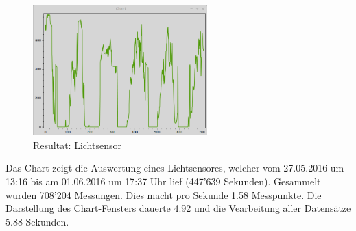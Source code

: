 \begin{figure}[H]
  \centering
  \includegraphics[width=0.6\textwidth]{./images/resultat.png}
  \caption{Resultat: Lichtsensor}
\end{figure}

Das Chart zeigt die Auswertung eines Lichtsensores, welcher vom 27.05.2016 um 13:16 bis am 01.06.2016 um 17:37 Uhr lief (447'639 Sekunden). Gesammelt wurden 708'204 Messungen. Dies macht pro Sekunde 1.58 Messpunkte. Die Darstellung des Chart-Fensters dauerte 4.92 und die Vearbeitung aller Datensätze 5.88 Sekunden.